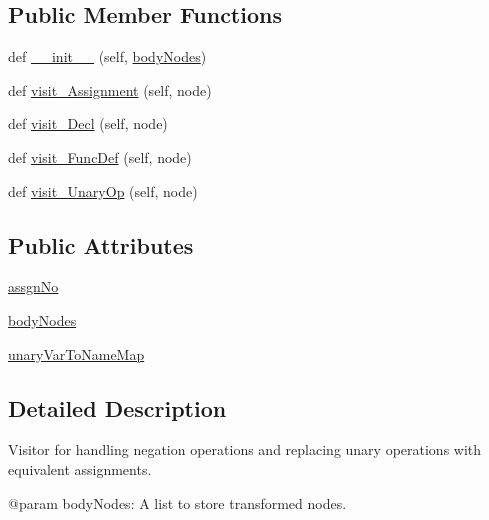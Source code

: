 \subsection*{Public Member Functions}
\begin{DoxyCompactItemize}
\item 
def \hyperlink{classPostProcessor_1_1Visitor_1_1NegationVisitor_a2ed95e2a3a463515d5383413f46a06ad}{\+\_\+\+\_\+init\+\_\+\+\_\+} (self, \hyperlink{classPostProcessor_1_1Visitor_1_1NegationVisitor_afde190707204b09a99ff642a6afa5695}{body\+Nodes})
\item 
def \hyperlink{classPostProcessor_1_1Visitor_1_1NegationVisitor_adae6ad6f5b94c4acd95924bb3df9ebc8}{visit\+\_\+\+Assignment} (self, node)
\item 
def \hyperlink{classPostProcessor_1_1Visitor_1_1NegationVisitor_a6568bead87923bbcaa593e5f226920f0}{visit\+\_\+\+Decl} (self, node)
\item 
def \hyperlink{classPostProcessor_1_1Visitor_1_1NegationVisitor_a49d407ef465dd0eba624f0f54fb18041}{visit\+\_\+\+Func\+Def} (self, node)
\item 
def \hyperlink{classPostProcessor_1_1Visitor_1_1NegationVisitor_ad32412c74dc29affe693267c23ea968a}{visit\+\_\+\+Unary\+Op} (self, node)
\end{DoxyCompactItemize}
\subsection*{Public Attributes}
\begin{DoxyCompactItemize}
\item 
\hyperlink{classPostProcessor_1_1Visitor_1_1NegationVisitor_a8e21c5a928a9743b32315c26ab87b613}{assgn\+No}
\item 
\hyperlink{classPostProcessor_1_1Visitor_1_1NegationVisitor_afde190707204b09a99ff642a6afa5695}{body\+Nodes}
\item 
\hyperlink{classPostProcessor_1_1Visitor_1_1NegationVisitor_a4c1b0115a62793d277d164b911165b46}{unary\+Var\+To\+Name\+Map}
\end{DoxyCompactItemize}


\subsection{Detailed Description}
\begin{DoxyVerb}Visitor for handling negation operations and replacing unary operations with equivalent assignments.

@param bodyNodes: A list to store transformed nodes.
\end{DoxyVerb}
 

